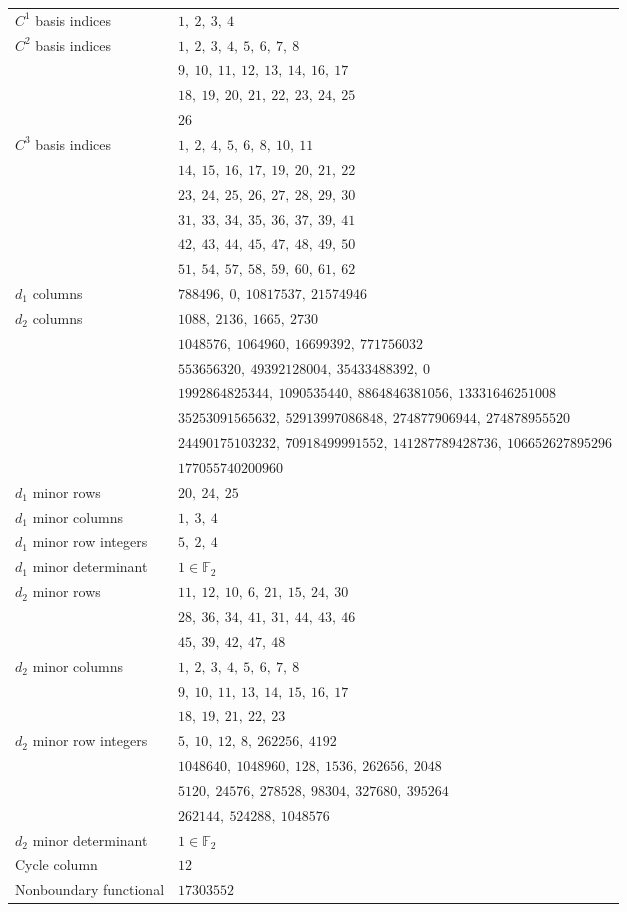 \begin{longtable}{l l}
\endhead
$C^{1}$ basis indices & $1,\ 2,\ 3,\ 4$\\
$C^{2}$ basis indices & $1,\ 2,\ 3,\ 4,\ 5,\ 6,\ 7,\ 8$\\
 & $9,\ 10,\ 11,\ 12,\ 13,\ 14,\ 16,\ 17$\\
 & $18,\ 19,\ 20,\ 21,\ 22,\ 23,\ 24,\ 25$\\
 & $26$\\
$C^{3}$ basis indices & $1,\ 2,\ 4,\ 5,\ 6,\ 8,\ 10,\ 11$\\
 & $14,\ 15,\ 16,\ 17,\ 19,\ 20,\ 21,\ 22$\\
 & $23,\ 24,\ 25,\ 26,\ 27,\ 28,\ 29,\ 30$\\
 & $31,\ 33,\ 34,\ 35,\ 36,\ 37,\ 39,\ 41$\\
 & $42,\ 43,\ 44,\ 45,\ 47,\ 48,\ 49,\ 50$\\
 & $51,\ 54,\ 57,\ 58,\ 59,\ 60,\ 61,\ 62$\\
$d_1$ columns & $788496,\ 0,\ 10817537,\ 21574946$\\
$d_2$ columns & $1088,\ 2136,\ 1665,\ 2730$\\
 & $1048576,\ 1064960,\ 16699392,\ 771756032$\\
 & $553656320,\ 49392128004,\ 35433488392,\ 0$\\
 & $1992864825344,\ 1090535440,\ 8864846381056,\ 13331646251008$\\
 & $35253091565632,\ 52913997086848,\ 274877906944,\ 274878955520$\\
 & $24490175103232,\ 70918499991552,\ 141287789428736,\ 106652627895296$\\
 & $177055740200960$\\
$d_1$ minor rows & $20,\ 24,\ 25$\\
$d_1$ minor columns & $1,\ 3,\ 4$\\
$d_1$ minor row integers & $5,\ 2,\ 4$\\
$d_1$ minor determinant & $1\in\mathbb F_2$\\
$d_2$ minor rows & $11,\ 12,\ 10,\ 6,\ 21,\ 15,\ 24,\ 30$\\
 & $28,\ 36,\ 34,\ 41,\ 31,\ 44,\ 43,\ 46$\\
 & $45,\ 39,\ 42,\ 47,\ 48$\\
$d_2$ minor columns & $1,\ 2,\ 3,\ 4,\ 5,\ 6,\ 7,\ 8$\\
 & $9,\ 10,\ 11,\ 13,\ 14,\ 15,\ 16,\ 17$\\
 & $18,\ 19,\ 21,\ 22,\ 23$\\
$d_2$ minor row integers & $5,\ 10,\ 12,\ 8,\ 262256,\ 4192$\\
 & $1048640,\ 1048960,\ 128,\ 1536,\ 262656,\ 2048$\\
 & $5120,\ 24576,\ 278528,\ 98304,\ 327680,\ 395264$\\
 & $262144,\ 524288,\ 1048576$\\
$d_2$ minor determinant & $1\in\mathbb F_2$\\
Cycle column & $12$\\
Nonboundary functional & $17303552$\\
\end{longtable}
